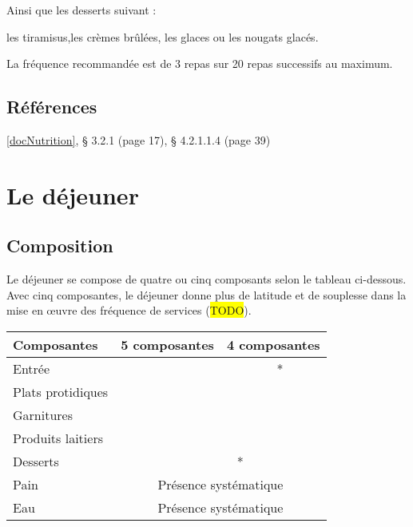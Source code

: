 Ainsi que les desserts suivant :

les tiramisus,les crèmes brûlées, les glaces ou les nougats glacés.

La fréquence recommandée est de 3 repas sur 20 repas successifs au maximum.

\subsection{Références}

\ref{docNutrition}, § 3.2.1 (page 17), § 4.2.1.1.4 (page 39)

\section{Le déjeuner}

\subsection{Composition}

Le déjeuner se compose de quatre ou cinq composants selon le tableau ci-dessous. Avec cinq composantes, le déjeuner donne plus de latitude et de souplesse dans la mise en œuvre des fréquence de services (\colorbox{yellow}{TODO}).

\newcommand\Chbx{\centering{\CheckedBox}}

\begin{center}

\begin{tabular}{|l|c|c|c|c|}
	\hline
	\textbf{Composantes} & \textbf{5 composantes} & \multicolumn{3}{|c|}{\textbf{4 composantes}} \\
	\hline
	Entrée & \checkmark & \checkmark & \checkmark ** & \cellcolor{gray} \\
	\hline
	Plats protidiques & \checkmark & \checkmark & \checkmark & \checkmark \\
	\hline
	Garnitures & \checkmark & \checkmark & \checkmark & \checkmark \\
	\hline
	Produits laitiers & \checkmark & \cellcolor{gray} & \checkmark & \checkmark \\
	\hline
	Desserts & \checkmark & \checkmark ** & \checkmark & \checkmark \\
	\hline
	Pain & \multicolumn{4}{|c|}{Présence systématique} \\
	\hline
	Eau & \multicolumn{4}{|c|}{Présence systématique} \\
	\hline
\end{tabular}

\end{center}

